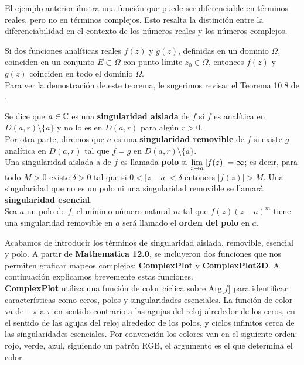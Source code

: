 El ejemplo anterior ilustra una función que puede ser diferenciable en términos reales, pero no en términos complejos. Esto resalta la distinción entre la diferenciabilidad en el contexto de los números reales y los números complejos.
\begin{teor}\label{TIFA}
	Si dos funciones analíticas reales $f(z)$ y $g(z)$, definidas en un dominio $\Omega$,
	coinciden en un conjunto $E \subset \Omega$ con punto límite $z_0 \in \Omega$, entonces $f(z)$ y $g(z)$ coinciden en todo el dominio $\Omega$.\\
	Para ver la demostración de este teorema, le sugerimos revisar el Teorema 10.8 de \cite{silverman}.
\end{teor} 
\begin{defi}
	Se dice que $a\in \mathbb{C}$ es una \textbf{singularidad aislada} de $f$ si $f$ es analítica en $D(a,r)\setminus\{a\}$ y no lo es en $D(a,r)$ para algún $r>0$.\\Por otra parte, diremos que $a$ es una \textbf{singularidad removible} de $f$ si existe $g$ analítica en $D(a,r)$ tal que $f=g$ en $D(a,r)\setminus\{a\}$.\\Una singularidad aislada a de $f$ es llamada \textbf{polo} si $\displaystyle\lim_{z\rightarrow a}|f(z)|=\infty$; es decir, para todo $M>0$ existe $\delta>0$ tal que si $0<|z-a|<\delta$ entonces $|f(z)|>M$. Una singularidad que no es un polo ni una singularidad removible se llamará
	\textbf{singularidad esencial}.\\Sea $a$ un polo de $f$, el mínimo número natural $m$ tal que $f(z)(z-a)^m$ tiene una singularidad removible en $a$ será llamado el \textbf{orden del polo} en $a$.
\end{defi}
Acabamos de introducir los términos de singularidad aislada, removible, esencial y polo.  A partir de \textbf{Mathematica 12.0}, se incluyeron dos funciones que  nos permiten graficar mapeos complejos:  \textbf{ComplexPlot} y \textbf{ComplexPlot3D}. A continuación explicamos brevemente estas funciones.\\
\textbf{ComplexPlot} utiliza una función de color cíclica sobre Arg[$f$] para identificar características como ceros, polos y singularidades esenciales. La función de color va de $-\pi$ a $\pi$ en sentido contrario a las agujas del reloj alrededor de los ceros, en el sentido de las agujas del reloj alrededor de los polos, y ciclos infinitos cerca de las singularidades esenciales. Por convención los colores van en el siguiente orden: rojo, verde, azul, siguiendo un patrón RGB, el argumento es el que determina el color.
